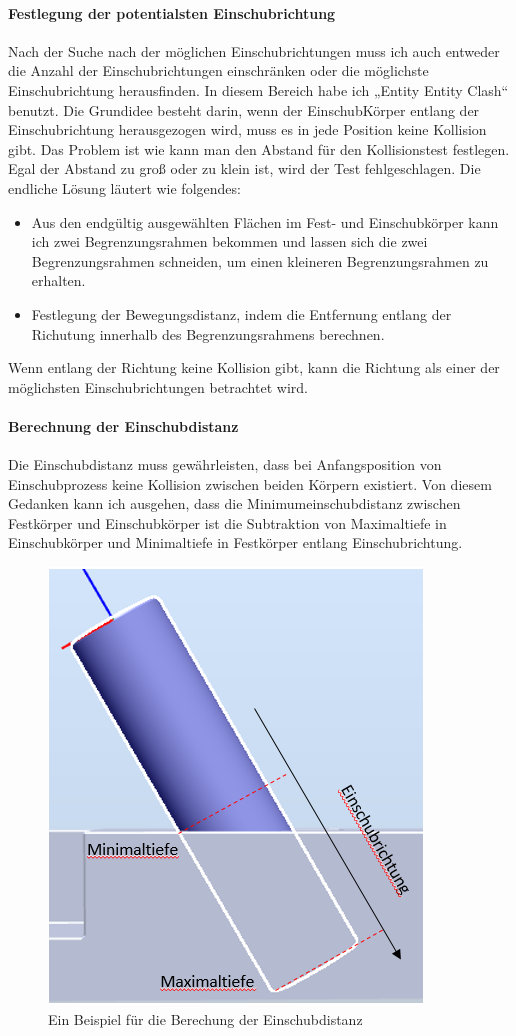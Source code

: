 \documentclass[14pt,a4paper,titlepage]{article}
\begin{document}
		\paragraph{Festlegung der potentialsten Einschubrichtung}
		Nach der Suche nach der möglichen Einschubrichtungen muss ich auch entweder die Anzahl der Einschubrichtungen einschränken oder die möglichste Einschubrichtung herausfinden. In diesem Bereich habe ich „Entity Entity Clash“ benutzt. Die Grundidee besteht darin, wenn der EinschubKörper entlang der Einschubrichtung herausgezogen wird, muss es in jede Position keine Kollision gibt.   
		\bigbreak
		Das Problem ist wie kann man den Abstand für den Kollisionstest festlegen. Egal der Abstand zu groß oder zu klein ist, wird der Test fehlgeschlagen. Die endliche Lösung läutert wie folgendes:
		\begin{itemize}
			\item Aus den endgültig ausgewählten Flächen im Fest- und Einschubkörper kann ich zwei Begrenzungsrahmen bekommen und lassen sich die zwei Begrenzungsrahmen schneiden, um einen kleineren Begrenzungsrahmen zu erhalten.
			
			\item Festlegung der Bewegungsdistanz, indem die Entfernung entlang der Richutung innerhalb des Begrenzungsrahmens berechnen.
		\end{itemize}                                  
		Wenn entlang der Richtung keine Kollision gibt, kann die Richtung als einer der möglichsten Einschubrichtungen betrachtet wird. 
		
		\paragraph{Berechnung der Einschubdistanz}
		 Die Einschubdistanz muss gewährleisten, dass bei Anfangsposition von Einschubprozess keine Kollision zwischen beiden Körpern existiert. 
		 Von diesem Gedanken kann ich ausgehen, dass die Minimumeinschubdistanz zwischen Festkörper und Einschubkörper ist die Subtraktion von Maximaltiefe in Einschubkörper und Minimaltiefe in Festkörper entlang Einschubrichtung.\\
		 	\begin{figure}[h!]
		 	\centering
		 	\includegraphics[width=0.3\linewidth]{Einschubdistanz.png}
		 	\caption{Ein Beispiel für die Berechung der Einschubdistanz}
		 	\end{figure} 
	 	
\end{document}
